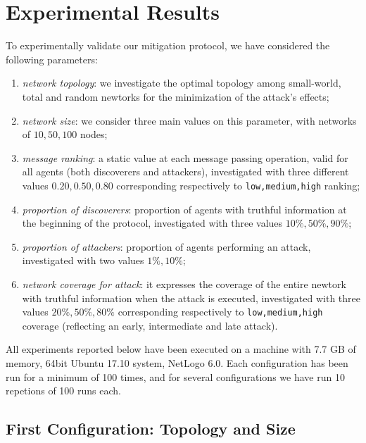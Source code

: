 \documentclass[compsoc, conference, letterpaper, 10pt, times]{IEEEtran}
\begin{document}
\section{Experimental Results}\label{sec:experiments}

To experimentally validate our mitigation protocol, we have considered the following parameters:

\begin{enumerate}
\item \textit{network topology}: we investigate the optimal topology among small-world, total and random newtorks for the minimization of the attack's effects;
\item \textit{network size}: we consider three main values on this parameter, with networks of $10,50,100$ nodes;
\item \textit{message ranking}: a static value at each message passing operation, valid for all agents (both discoverers and attackers), investigated with three different values $0.20, 0.50, 0.80$ corresponding respectively to \texttt{low,medium,high} ranking;
\item \textit{proportion of discoverers}: proportion of agents with truthful information at the beginning of the protocol, investigated with three values $10\%, 50\%, 90\%$;
\item \textit{proportion of attackers}: proportion of agents performing an attack, investigated with two values $1\%, 10\%$;
\item \textit{network coverage for attack}: it expresses the coverage of the entire newtork with truthful information when the attack is executed, investigated with three values $20\%, 50\%, 80\%$ corresponding respectively to \texttt{low,medium,high} coverage (reflecting an early, intermediate and late attack).
\end{enumerate}

All experiments reported below have been executed on a machine with 7.7 GB of memory, 64bit Ubuntu 17.10 system, NetLogo 6.0. Each configuration has been run for a minimum of 100 times, and for several configurations we have run 10 repetions of 100 runs each.

\subsection{First Configuration: Topology and Size}
\end{document}
